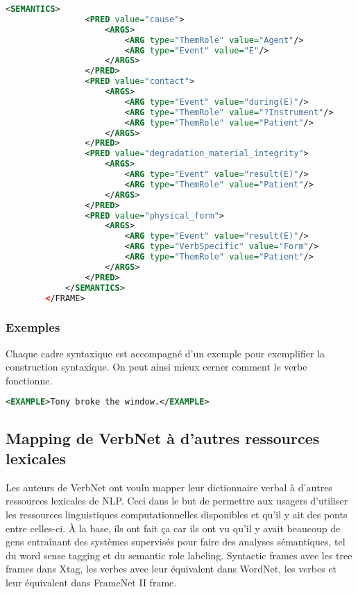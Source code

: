\begin{lstlisting}[language=Xml, caption = Les prédicats sémantiques]
<SEMANTICS>
                <PRED value="cause">
                    <ARGS>
                        <ARG type="ThemRole" value="Agent"/>
                        <ARG type="Event" value="E"/>
                    </ARGS>
                </PRED>
                <PRED value="contact">
                    <ARGS>
                        <ARG type="Event" value="during(E)"/>
                        <ARG type="ThemRole" value="?Instrument"/>
                        <ARG type="ThemRole" value="Patient"/>
                    </ARGS>
                </PRED>
                <PRED value="degradation_material_integrity">
                    <ARGS>
                        <ARG type="Event" value="result(E)"/>
                        <ARG type="ThemRole" value="Patient"/>
                    </ARGS>
                </PRED>
                <PRED value="physical_form">
                    <ARGS>
                        <ARG type="Event" value="result(E)"/>
                        <ARG type="VerbSpecific" value="Form"/>
                        <ARG type="ThemRole" value="Patient"/>
                    </ARGS>
                </PRED>
            </SEMANTICS>
        </FRAME>
\end{lstlisting}

\subsubsection{Exemples}

Chaque cadre syntaxique est accompagné d'un exemple pour exemplifier la construction syntaxique. On peut ainsi mieux cerner comment le verbe fonctionne.

\begin{lstlisting}[language=Xml, caption= Exemple]
<EXAMPLE>Tony broke the window.</EXAMPLE>
\end{lstlisting}

\subsection {Mapping de VerbNet à d'autres ressources lexicales} 

Les auteurs de VerbNet ont voulu mapper leur dictionnaire verbal à d'autres ressources lexicales de NLP. Ceci dans le but de permettre aux usagers d'utiliser les ressources linguistiques computationnelles disponibles et qu'il y ait des ponts entre celles-ci. À la base, ils ont fait ça car ils ont vu qu'il y avait beaucoup de gens entraînant des systèmes supervisés pour faire des analyses sémantiques, tel du word sense tagging et du semantic role labeling. Syntactic frames avec les tree frames dans Xtag, les verbes avec leur équivalent dans WordNet, les verbes et leur équivalent dans FrameNet II frame.


